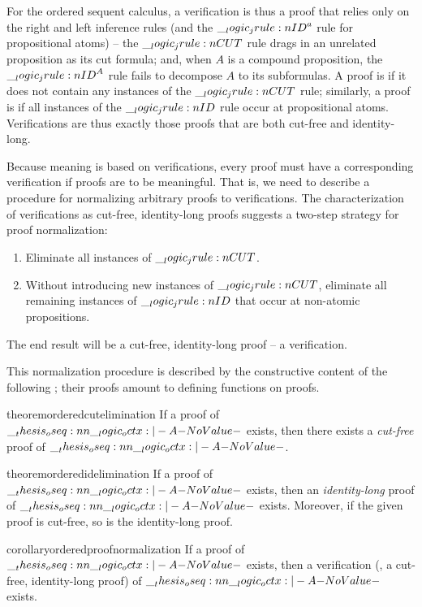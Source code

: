 For the ordered sequent calculus, a verification is thus a proof that relies only on the right and left inference rules (and the $\__logic_jrule:n {ID}^{a}$ rule for propositional atoms) -- the $\__logic_jrule:n {CUT}$ rule drags in an unrelated proposition as its cut formula; and, when $A$ is a compound proposition, the $\__logic_jrule:n {ID}^A$ rule fails to decompose $A$ to its subformulas.
A proof is  if it does not contain any instances of the $\__logic_jrule:n {CUT}$ rule; similarly, a proof is  if all instances of the $\__logic_jrule:n {ID}$ rule occur at propositional atoms.
Verifications are thus exactly those proofs that are both cut-free and identity-long.

Because meaning is based on verifications, every proof must have a corresponding verification if proofs are to be meaningful.
That is, we need to describe a procedure for normalizing arbitrary proofs to verifications.
The characterization of verifications as cut-free, identity-long proofs suggests a two-step strategy for proof normalization:
\begin{enumerate}[topsep=.33\baselineskip, noitemsep]
  \label{list:ordered-logic:normalization}
\item Eliminate all instances of $\__logic_jrule:n {CUT}$.
\item Without introducing new instances of $\__logic_jrule:n {CUT}$, eliminate all remaining instances of $\__logic_jrule:n {ID}$ that occur at non-atomic propositions.
\end{enumerate}
The end result will be a cut-free, identity-long proof -- a verification.

This normalization procedure is described by the constructive content of the following ; their proofs amount to defining functions on proofs.%
%
\begin{restatable*}[
      name=Cut elimination,
      label=thm:ordered-logic:cut-elimination
    ]{theorem}{orderedcutelimination}
      If a proof of\/ $\oseq{\octx |- A}$ exists, then there exists a \emph{cut-free} proof of\/ $\oseq{\octx |- A}$.
    \end{restatable*}
%
\begin{restatable*}[
      name=Identity elimination,
      label=thm:ordered-logic:identity-elimination
    ]{theorem}{orderedidelimination}
      If a proof of\/ $\oseq{\octx |- A}$ exists, then an \emph{identity-long} proof of\/ $\oseq{\octx |- A}$ exists.
      Moreover, if the given proof is cut-free, so is the identity-long proof.
    \end{restatable*}
%
\begin{restatable*}[
  name=Proof normalization,
  label=cor:ordered-logic:proof-normalization
]{corollary}{orderedproofnormalization}
  If a proof of\/ $\oseq{\octx |- A}$ exists, then a verification (\ie, a cut-free, identity-long proof) of\/ $\oseq{\octx |- A}$ exists.
\end{restatable*}

